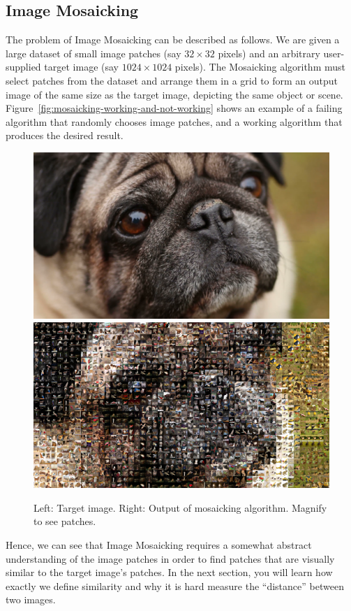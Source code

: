 \documentclass[a4paper]{article}
\begin{document}
	\subsection{Image Mosaicking}
		The problem of Image Mosaicking can be described as follows.
		We are given a large dataset of small image patches (say $32 \times 32$ pixels) and an arbitrary user-supplied target image (say $1024 \times 1024$ pixels).
		The Mosaicking algorithm must select patches from the dataset and arrange them in a grid to form an output image of the same size as the target image, depicting the same object or scene.
		Figure~\ref{fig:mosaicking-working-and-not-working} shows an example of a failing algorithm that randomly chooses image patches, and a working algorithm that produces the desired result.
		\begin{figure}
			\centering
			\includegraphics[width=0.49\linewidth]{dog1}
			\includegraphics[width=0.49\linewidth]{mosaic-dog1-nearest}
			\caption{
				Left: Target image. 
				Right: Output of mosaicking algorithm. 
				Magnify to see patches.
			}
			\label{fig:mosaic-dog1-nearest}
		\end{figure}
		Hence, we can see that Image Mosaicking requires a somewhat abstract understanding of the image patches in order to find patches that are visually similar to the target image's patches.
		In the next section, you will learn how exactly we define similarity and why it is hard measure the ``distance'' between two images.
		
\end{document}
